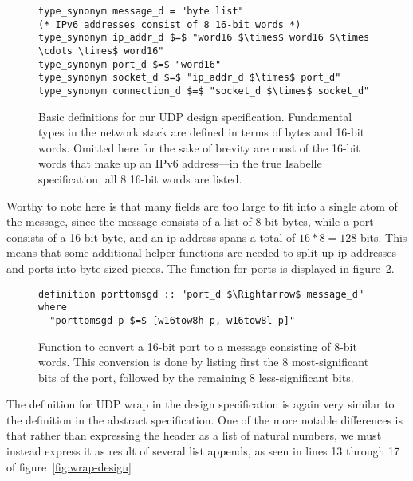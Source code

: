\documentclass[twoside]{memoir}
\begin{document}
\begin{figure}[htpb]
    \centering
\begin{lstlisting}[language=isabelle]
type_synonym message_d = "byte list"
(* IPv6 addresses consist of 8 16-bit words *)
type_synonym ip_addr_d $=$ "word16 $\times$ word16 $\times \cdots \times$ word16"
type_synonym port_d $=$ "word16"
type_synonym socket_d $=$ "ip_addr_d $\times$ port_d"
type_synonym connection_d $=$ "socket_d $\times$ socket_d"
\end{lstlisting}
    \caption{Basic definitions for our UDP design specification.
    Fundamental types in the network stack are defined
    in terms of bytes and 16-bit words.
    Omitted here for the sake of brevity are most of the 16-bit words
    that make up an IPv6 address---in the true Isabelle specification,
    all 8 16-bit words are listed.}
    \label{fig:defs-design}
\end{figure}

Worthy to note here is that many fields are too large to fit into
a single atom of the message, since the message consists of a list of
8-bit bytes, while a port consists of a 16-bit byte, and
an ip address spans a total of $16*8= 128$ bits.
This means that some additional helper functions are needed
to split up ip addresses and ports into byte-sized pieces.
The function for ports is displayed in figure~\ref{fig:porttomsg-design}.

\begin{figure}[htpb]
    \centering
\begin{lstlisting}[language=isabelle]
definition porttomsgd :: "port_d $\Rightarrow$ message_d" where
  "porttomsgd p $=$ [w16tow8h p, w16tow8l p]"
\end{lstlisting}
    \caption{Function to convert a 16-bit port to a message
        consisting of 8-bit words.
        This conversion is done by listing first the 8
        most-significant bits of the port, followed by
        the remaining 8 less-significant bits.}
    \label{fig:porttomsg-design}
\end{figure}

The definition for UDP wrap in the design specification is
again very similar to the definition in the abstract specification.
One of the more notable differences is 
that rather than expressing the header as a list of natural numbers,
we must instead express it as result of several list appends,
as seen in lines 13 through 17 of figure~\ref{fig:wrap-design}
\end{document}
